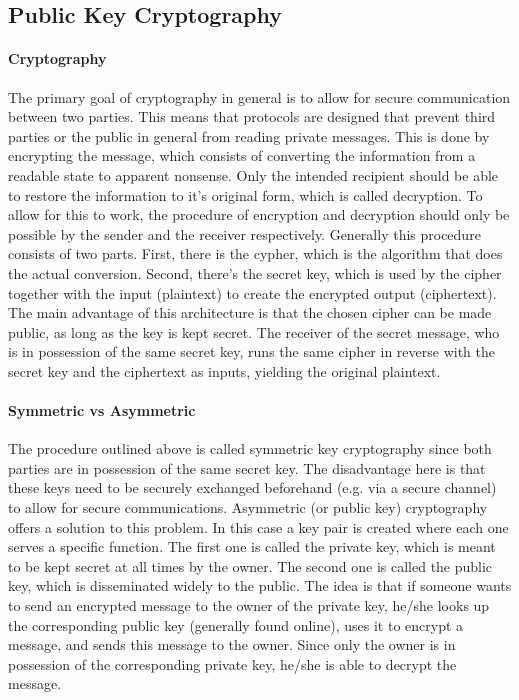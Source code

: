 \documentclass[11pt]{article}
\begin{document}
\subsection{Public Key Cryptography}
\label{sec:PKC}

\paragraph{Cryptography} The primary goal of cryptography in general is to allow for secure communication between two parties. This means that protocols are designed that prevent third parties or the public in general from reading private messages. This is done by encrypting the message, which consists of converting the information from a readable state to apparent nonsense. Only the intended recipient should be able to restore the information to it's original form, which is called decryption. To allow for this to work, the procedure of encryption and decryption should only be possible by the sender and the receiver respectively. Generally this procedure consists of two parts. First, there is the cypher, which is the algorithm that does the actual conversion. Second, there's the secret key, which is used by the cipher together with the input (plaintext) to create the encrypted output (ciphertext). The main advantage of this architecture is that the chosen cipher can be made public, as long as the key is kept secret. The receiver of the secret message, who is in possession of the same secret key, runs the same cipher in reverse with the secret key and the ciphertext as inputs, yielding the original plaintext.\cite{Cryptowiki}

\paragraph{Symmetric vs Asymmetric}The procedure outlined above is called symmetric key cryptography since both parties are in possession of the same secret key. The disadvantage here is that these keys need to be securely exchanged beforehand (e.g. via a secure channel) to allow for secure communications. Asymmetric (or public key) cryptography offers a solution to this problem. In this case a key pair is created where each one serves a specific function. The first one is called the private key, which is meant to be kept secret at all times by the owner. The second one is called the public key, which is disseminated widely to the public. The idea is that if someone wants to send an encrypted message to the owner of the private key, he/she looks up the corresponding public key (generally found online), uses it to encrypt a message, and sends this message to the owner. Since only the owner is in possession of the corresponding private key, he/she is able to decrypt the message.
\end{document}
